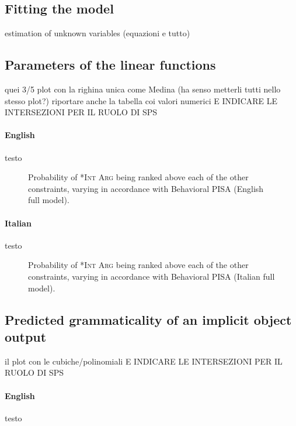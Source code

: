 \subsection{Fitting the model} 

estimation of unknown variables (equazioni e tutto)


\subsection{Parameters of the linear functions} 

quei 3/5 plot con la righina unica come Medina (ha senso metterli tutti nello stesso plot?)
riportare anche la tabella coi valori numerici E INDICARE LE INTERSEZIONI PER IL RUOLO DI SPS

\paragraph{English} testo

\begin{figure}[htb]
\caption{Probability of \textsc{*Int Arg} being ranked above each of the other constraints, varying in accordance with Behavioral PISA (English full model).}
    
\end{figure}

\paragraph{Italian} testo

\begin{figure}[htb]
\caption{Probability of \textsc{*Int Arg} being ranked above each of the other constraints, varying in accordance with Behavioral PISA (Italian full model).}
    
\end{figure}


\subsection{Predicted grammaticality of an implicit object output} 

il plot con le cubiche/polinomiali E INDICARE LE INTERSEZIONI PER IL RUOLO DI SPS

\paragraph{English} testo


